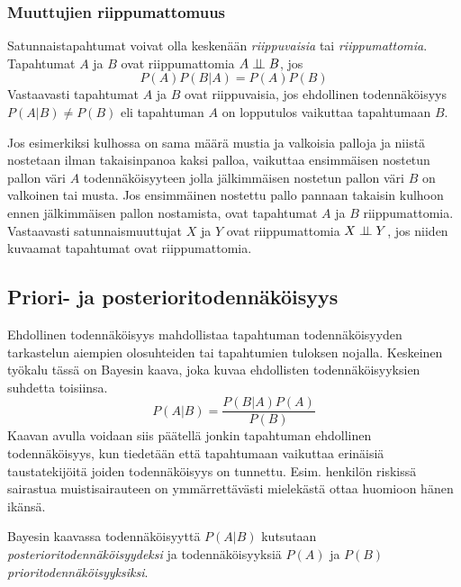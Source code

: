 \subsubsection{Muuttujien riippumattomuus}
Satunnaistapahtumat voivat olla keskenään \emph{riippuvaisia} tai \emph{riippumattomia}. Tapahtumat $A$ ja $B$ ovat riippumattomia $A \perp \!\!\! \perp B$, jos
$$
    P(A)P(B|A) = P(A)P(B) 
$$
Vastaavasti tapahtumat $A$ ja $B$ ovat riippuvaisia, jos ehdollinen todennäköisyys $P(A|B) \not= P(B)$ eli tapahtuman $A$ on lopputulos vaikuttaa tapahtumaan $B$.

Jos esimerkiksi  kulhossa on sama määrä mustia ja valkoisia palloja ja niistä nostetaan ilman takaisinpanoa kaksi palloa, vaikuttaa ensimmäisen nostetun pallon väri $A$ todennäköisyyteen jolla jälkimmäisen nostetun pallon väri $B$ on valkoinen tai musta. Jos ensimmäinen nostettu pallo pannaan takaisin kulhoon ennen jälkimmäisen pallon nostamista, ovat tapahtumat $A$ ja $B$ riippumattomia. Vastaavasti satunnaismuuttujat $X$ ja $Y$ ovat riippumattomia $X \perp \!\!\! \perp Y$, jos niiden kuvaamat tapahtumat ovat riippumattomia.

\subsection{Priori- ja posterioritodennäköisyys}
Ehdollinen todennäköisyys mahdollistaa  tapahtuman todennäköisyyden tarkastelun aiempien olosuhteiden tai tapahtumien tuloksen nojalla. Keskeinen työkalu tässä on Bayesin kaava, joka kuvaa ehdollisten todennäköisyyksien suhdetta toisiinsa.
$$
    P(A|B) = \frac{P(B|A)P(A)}{P(B)}
$$
Kaavan avulla voidaan siis päätellä jonkin tapahtuman ehdollinen todennäköisyys, kun tiedetään että tapahtumaan vaikuttaa erinäisiä taustatekijöitä joiden todennäköisyys on tunnettu. Esim. henkilön riskissä sairastua muistisairauteen on ymmärrettävästi mielekästä ottaa huomioon hänen ikänsä.

Bayesin kaavassa todennäköisyyttä $P(A|B)$ kutsutaan \emph{posterioritodennäköisyydeksi} ja todennäköisyyksiä $P(A)$ ja $P(B)$ \emph{prioritodennäköisyyksiksi}.



 

